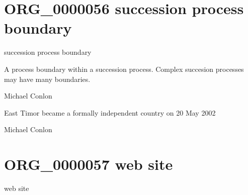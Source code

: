 \documentclass[letterpaper,10pt,english]{sphinxmanual}
\begin{document}
\section{ORG\_0000056 \sphinxhyphen{} succession process boundary}
\label{\detokenize{doc-ORG_0000056:org-0000056-succession-process-boundary}}\label{\detokenize{doc-ORG_0000056:index-0}}\label{\detokenize{doc-ORG_0000056::doc}}
\begin{sphinxShadowBox}

\sphinxAtStartPar
succession process boundary
\end{sphinxShadowBox}

\begin{sphinxShadowBox}

\sphinxAtStartPar
A process boundary within a succession process.  Complex succesion processes may have many boundaries.
\end{sphinxShadowBox}

\begin{sphinxShadowBox}

\sphinxAtStartPar
Michael Conlon 
\end{sphinxShadowBox}

\begin{sphinxShadowBox}

\sphinxAtStartPar
East Timor became a formally independent country on 20 May 2002
\end{sphinxShadowBox}

\begin{sphinxShadowBox}

\sphinxAtStartPar
Michael Conlon 
\end{sphinxShadowBox}
\begin{quote}
\label{\detokenize{doc-ORG_0000057:org-0000057}}\label{\detokenize{doc-ORG_0000057:web-site}}\label{\detokenize{doc-ORG_0000057:org-0000057}}
\ignorespaces \end{quote}


\section{ORG\_0000057 \sphinxhyphen{} web site}
\label{\detokenize{doc-ORG_0000057:org-0000057-web-site}}\label{\detokenize{doc-ORG_0000057:index-0}}\label{\detokenize{doc-ORG_0000057::doc}}
\begin{sphinxShadowBox}

\sphinxAtStartPar
web site
\end{sphinxShadowBox}
\end{document}
